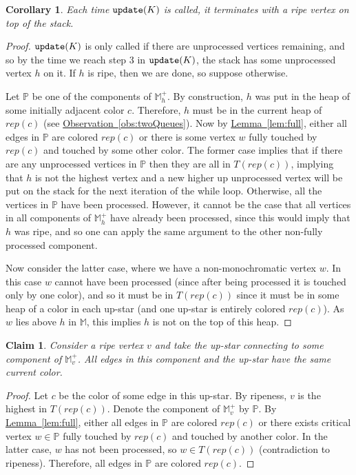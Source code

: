 \documentclass[11pt]{article}
\newtheorem{claim}[theorem]{Claim}
\newtheorem{corollary}[theorem]{Corollary}
\theoremstyle{definition}
\newcommand{\MM}{\mathbb{M}}
\newcommand{\PP}{\mathbb{P}}
\newcommand{\Lem}[1]{\hyperref[lem:#1]{Lemma~\ref*{lem:#1}}} %
\newcommand{\Obs}[1]{\hyperref[obs:#1]{Observation~\ref*{obs:#1}}} %
\newcommand{\rep}{rep}
\newcommand{\update}{{\tt update}}
\begin{document}
\begin{corollary}
\label{cor:terminate}
 Each time $\update(K)$ is called, it terminates with a ripe vertex on top of the stack.
\end{corollary}
\begin{proof}
 $\update(K)$ is only called if there are unprocessed vertices remaining, and so by the time we reach step 3 in 
 $\update(K)$, the stack has some unprocessed vertex $h$ on it.  
 If $h$ is ripe, then we are done, so suppose otherwise.
 
 Let $\PP$ be one of the components of $\MM^+_h$.  By construction, $h$ was put in the heap of some initially  
 adjacent color $c$.  Therefore, $h$ must be in the current heap of $\rep(c)$ (see \Obs{twoQueues}).  
 Now by \Lem{full}, either all edges in $\PP$ are colored $\rep(c)$ or  
 there is some vertex $w$ fully touched by $\rep(c)$ and touched by some other color.  
 The former case implies that if there are any unprocessed vertices in $\PP$ then they are all in $T(\rep(c))$, 
 implying that $h$ is not the highest vertex and a new higher up unprocessed vertex will be put on the stack for the next iteration of the while loop.  
 Otherwise, all the vertices in $\PP$ have been processed.  
 However, it cannot be the case that all vertices in all components of $\MM^+_h$ have already been processed, 
 since this would imply that $h$ was ripe, and so one can apply the same argument to the other non-fully processed component. 
 
 Now consider the latter case, where we have a non-monochromatic vertex $w$.
 In this case $w$ cannot have been processed (since after being processed it is touched only by one color), 
 and so it must be in $T(\rep(c))$ since it must be in some heap of a color in each up-star (and one up-star is entirely colored $\rep(c)$).
 As $w$ lies above $h$ in $\MM$, this implies $h$ is not on the top of this heap.
\end{proof}


\begin{claim} \label{clm:upstar} Consider a ripe vertex $v$ and take the up-star connecting
to some component of $\MM^+_v$. All edges in this component and the up-star have the same current color.
\end{claim}

\begin{proof} Let $c$ be the color of some edge in this up-star.
By ripeness, $v$ is the highest in $T(\rep(c))$.
Denote the component of $\MM^+_v$ by $\PP$.
By \Lem{full}, either all edges in $\PP$ are colored $\rep(c)$ or there exists critical vertex $w \in \PP$
fully touched by $\rep(c)$ and touched by another color. In the latter case, $w$ has not been processed,
so $w \in T(\rep(c))$ (contradiction to ripeness). Therefore, all edges in $\PP$ are colored $\rep(c)$.
\end{proof}
\end{document}
